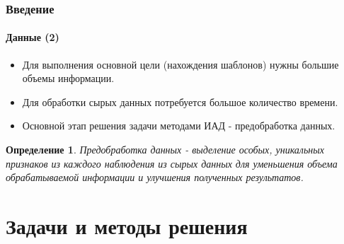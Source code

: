 \documentclass[xcolor=table]{beamer}
\newtheorem{defn}{Определение}
\begin{document}
\begin{frame}
  \frametitle{Введение}
  \framesubtitle{Данные (2)}
  
  \begin{itemize}
  \item Для выполнения основной цели (нахождения шаблонов) нужны большие объемы информации.
    
  \item Для обработки сырых данных потребуется большое количество времени.
      
  \item Основной этап решения задачи методами ИАД - \alert{предобработка данных}.
  \end{itemize}
  
  \begin{defn}
    Предобработка данных - выделение особых, уникальных признаков из каждого наблюдения из сырых данных для уменьшения объема обрабатываемой информации и улучшения полученных результатов.
  \end{defn}

\end{frame}


\section{Задачи и методы решения}
\end{document}
